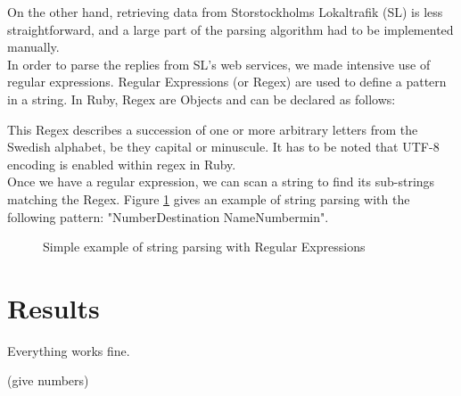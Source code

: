 On the other hand, retrieving data from Storstockholms Lokaltrafik (SL) is less straightforward, and a large part of the parsing algorithm had to be implemented manually.\\

In order to parse the replies from SL's web services, we made intensive use of regular expressions. Regular Expressions (or Regex) are used to define a pattern in a string. In Ruby, Regex are Objects and can be declared as follows:

\parbox{15cm}{

}

This Regex describes a succession of one or more arbitrary letters from the Swedish alphabet, be they capital or minuscule. It has to be noted that UTF-8 encoding is enabled within regex in Ruby.\\

Once we have a regular expression, we can scan a string to find its sub-strings matching the Regex. Figure \ref{fig:regex_scan_example} gives an example of string parsing with the following pattern: "Number\textvisiblespace{}Destination Name\textvisiblespace{}Number\textvisiblespace{}min".

\begin{figure}[ht]
  \centering
  \caption{Simple example of string parsing with Regular Expressions}
  \label{fig:regex_scan_example}
\end{figure}

\section{Results}

Everything works fine.

(give numbers)